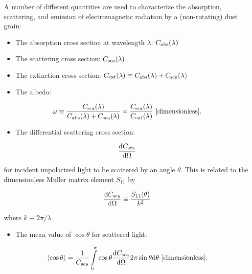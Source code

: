 \documentclass[a4paper,10pt]{article}
\begin{document}
{\noindent}A number of different quantities are used to characterize the absorption, scattering, and emission of electromagnetic radiation by a (non-rotating) dust grain:

\begin{itemize}
    \item The absorption cross section at wavelength $\lambda$: $C_{\rm abs}(\lambda)$
    \item The scattering cross section: $C_{\rm sca}(\lambda)$
    \item The extinction cross section: $C_{\rm ext}(\lambda) \equiv C_{\rm abs}(\lambda)+C_{\rm sca}(\lambda)$
    \item The albedo:
\end{itemize}

\begin{align*}
    \omega \equiv \frac{C_{\rm sca}(\lambda)}{C_{\rm abs}(\lambda)+C_{\rm sca}(\lambda)} = \frac{C_{\rm sca}(\lambda)}{C_{\rm ext}(\lambda)} ~ [{\rm dimensionless}].
\end{align*}

\begin{itemize}
    \item The differential scattering cross section:
\end{itemize}

\begin{align*}
   \frac{{\rm d}C_{\rm sca}}{{\rm d}\Omega}
\end{align*}

for incident unpolarized light to be scattered by an angle $\theta$. This is related to the dimensionless Muller matrix element $S_{11}$ by

\begin{align*}
   \frac{{\rm d}C_{\rm sca}}{{\rm d}\Omega} \equiv \frac{S_{11}(\theta)}{k^2}
\end{align*}

where $k\equiv2\pi/\lambda$.

\begin{itemize}
    \item The mean value of $\cos\theta$ for scattered light:
\end{itemize}

\begin{align*}
   \langle\cos\theta\rangle = \frac{1}{C_{\rm sca}}\int\limits_0^\pi \cos\theta \frac{{\rm d}C_{\rm sca}}{{\rm d}\Omega} 2\pi\sin\theta{\rm d}\theta ~ [{\rm dimensionless}].
\end{align*}
\end{document}
